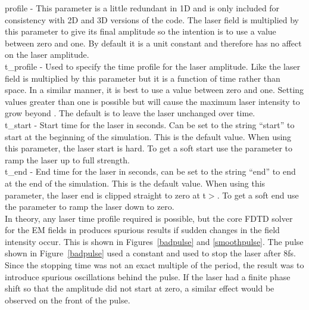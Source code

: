 {\emphtext profile} - This parameter is a little redundant in 1D and is
only included for consistency with 2D and 3D versions of the code.
The laser field is multiplied by this parameter to give its final amplitude
so the intention is to use a value between zero and one. By default it is a
unit constant and therefore has no affect on the laser amplitude.\\

{\emphtext t\_profile} - Used to specify the time profile for the laser
amplitude. Like  the laser field is multiplied by
this parameter but it is a function of time rather than space. In a similar
manner, it is best to use a value between zero and one.
Setting values greater than one is possible but will cause the maximum laser
intensity to grow beyond . The default is to leave the
laser unchanged over time.\\

{\emphtext t\_start} - Start time for the laser in seconds. Can be set to the
string ``start'' to start at the beginning of the simulation. This is the
default value. When using this parameter, the laser start is hard. To get a
soft start use the  parameter to ramp the laser up to
full strength.\\

{\emphtext t\_end} - End time for the laser in seconds, can be set to the
string ``end'' to end at the end of the simulation. This is the default value.
When using this parameter, the laser end is clipped straight to zero at
t$>$. To get a soft end use the 
parameter to ramp the laser down to zero.\\

In theory, any laser time profile required is possible, but the core FDTD
solver for the EM fields in {\EPOCH} produces spurious results if sudden
changes in the field intensity occur. This is shown in Figures~\ref{badpulse}
and \ref{smoothpulse}. The pulse shown in Figure~\ref{badpulse} used a constant
 and used  to stop the laser after
8fs. Since the stopping time was not an exact multiple of the period, the
result was to introduce spurious oscillations behind the pulse. If the laser
had a finite phase shift so that the amplitude did not start at zero, a
similar effect would be observed on the front of the pulse.


